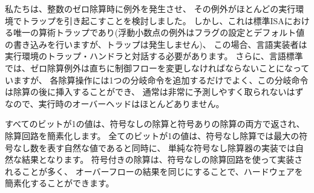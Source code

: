 \begin{commentary}
\begin{comment}
We considered raising exceptions on integer divide by zero, with these
exceptions causing a trap in most execution environments.  However,
this would be the only arithmetic trap in the standard ISA
(floating-point exceptions set flags and write default values, but do
not cause traps) and would require language implementors to interact
with the execution environment's trap handlers for this case.
Further, where language standards mandate that a divide-by-zero
exception must cause an immediate control flow change, only a single
branch instruction needs to be added to each divide operation, and
this branch instruction can be inserted after the divide and should
normally be very predictably not taken, adding little runtime
overhead.
\end{comment}

私たちは、整数のゼロ除算時に例外を発生させ、
その例外がほとんどの実行環境でトラップを引き起こすことを検討しました。 
しかし、これは標準ISAにおける唯一の算術トラップであり(浮動小数点の例外はフラグの設定とデフォルト値の書き込みを行いますが、トラップは発生しません)、
この場合、言語実装者は実行環境のトラップ・ハンドラと対話する必要があります。
さらに、言語標準では、ゼロ除算例外は直ちに制御フローを変更しなければならないことになっていますが、
各除算操作には1つの分岐命令を追加するだけでよく、この分岐命令は除算の後に挿入することができ、
通常は非常に予測しやすく取られないはずなので、実行時のオーバーヘッドはほとんどありません。

\begin{comment}
The value of all bits set is returned for both unsigned and signed
divide by zero to simplify the divider circuitry.  The value of all 1s
is both the natural value to return for unsigned divide, representing
the largest unsigned number, and also the natural result for simple
unsigned divider implementations.  Signed division is often
implemented using an unsigned division circuit and specifying the same
overflow result simplifies the hardware.
\end{comment}

すべてのビットが1の値は、符号なしの除算と符号ありの除算の両方で返され、
除算回路を簡素化します。
全てのビットが1の値は、符号なし除算では最大の符号なし数を表す自然な値であると同時に、
単純な符号なし除算器の実装では自然な結果となります。
符号付きの除算は、符号なしの除算回路を使って実装されることが多く、
オーバーフローの結果を同じにすることで、ハードウェアを簡素化することができます。
\end{commentary}
